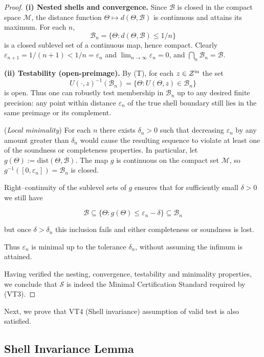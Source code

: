 \documentclass[12pt]{article}
\theoremstyle{definition}
\theoremstyle{plain}
\begin{document}
\begin{proof}
\textbf{(i) Nested shells and convergence.}
Since \(\mathcal B\) is closed in the compact space \(\mathcal M\), the distance function
\(\Theta\mapsto d(\Theta,\mathcal B)\) is continuous and attains its maximum.  For each \(n\),
\[
  \mathcal B_n = \{\Theta: d(\Theta,\mathcal B)\le1/n\}
\]
is a closed sublevel set of a continuous map, hence compact.  Clearly
\(\varepsilon_{n+1}=1/(n+1)<1/n=\varepsilon_n\) and \(\lim_{n\to\infty}\varepsilon_n=0\),
and \(\bigcap_n\mathcal B_n=\mathcal B\).

\medskip\noindent
\textbf{(ii) Testability (open-preimage).}
By (T), for each \(z\in\mathcal Z^{\rm in}\) the set
\[
  U(\cdot,z)^{-1}(\mathcal B_n)
  = \{\Theta: U(\Theta,z)\in\mathcal B_n\}
\]
is open.  Thus one can robustly test membership in \(\mathcal B_n\) up to any desired finite precision: any point within distance \(\varepsilon_n\) of the true shell boundary still lies in the same preimage or its complement.

\medskip\noindent
\item[(iii)] (\emph{Local minimality})  
For each $n$ there exists $\delta_n>0$ such that decreasing $\varepsilon_n$ by any
amount greater than $\delta_n$ would cause the resulting sequence
to violate at least one of the soundness or completeness properties.
In particular, let $g(\Theta):=\mathrm{dist}(\Theta,\mathcal B)$.
The map $g$ is continuous on the compact set $\mathcal M$,
so $g^{-1}([0,\varepsilon_n])=\mathcal B_n$ is closed.

Right–continuity of the sublevel sets of $g$ ensures that for sufficiently small
$\delta>0$ we still have 

\[\mathcal B \subseteq \{\Theta : g(\Theta)\le \varepsilon_n-\delta\}
\subseteq \mathcal B_n\]

but once $\delta>\delta_n$ this inclusion fails and
either completeness or soundness is lost.

Thus $\varepsilon_n$ is minimal up to the tolerance $\delta_n$, without assuming the infimum is attained.


\medskip
Having verified the nesting, convergence, testability and minimality properties, we conclude that \(\mathcal S\) is indeed the Minimal Certification Standard required by (VT3).
\end{proof}
\medskip
Next, we prove that VT4 (Shell invariance) assumption of valid test is also satisfied.


\subsection{Shell Invariance Lemma}
\end{document}
